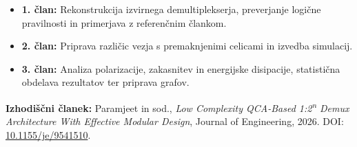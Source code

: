 \documentclass[10pt,a4paper]{article}
\begin{document}
\begin{itemize}
    \item \textbf{1. član:} Rekonstrukcija izvirnega demultiplekserja, preverjanje logične pravilnosti in primerjava z referenčnim člankom.
    \item \textbf{2. član:} Priprava različic vezja s premaknjenimi celicami in izvedba simulacij.
    \item \textbf{3. član:} Analiza polarizacije, zakasnitev in energijske disipacije, statistična obdelava rezultatov ter priprava grafov.
\end{itemize}

\vspace{3pt}
{\footnotesize\textbf{Izhodiščni članek:} Paramjeet in sod., \emph{Low Complexity QCA-Based 1:2\textsuperscript{n} Demux Architecture With Effective Modular Design}, Journal of Engineering, 2026. DOI: \href{https://doi.org/10.1155/je/9541510}{10.1155/je/9541510}.}
\end{document}
